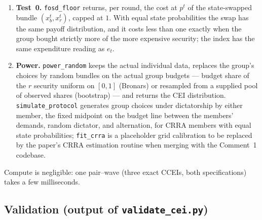 \documentclass[11pt]{article}
\theoremstyle{remark}
\begin{document}
\begin{enumerate}[leftmargin=1.6em]
\item \textbf{Test~0.} \texttt{fosd\_floor} returns, per round, the cost at $p^t$ of the state-swapped bundle $(x^t_b,x^t_r)$, capped at $1$. With equal state probabilities the swap has the same payoff distribution, and it costs less than one exactly when the group bought strictly more of the more expensive security; the index has the same expenditure reading as $e_t$.
\item \textbf{Power.} \texttt{power\_random} keeps the actual individual data, replaces the group's choices by random bundles on the actual group budgets --- budget share of the $r$ security uniform on $[0,1]$ (Bronars) or resampled from a supplied pool of observed shares (bootstrap) --- and returns the CEI distribution. \texttt{simulate\_protocol} generates group choices under dictatorship by either member, the fixed midpoint on the budget line between the members' demands, random dictator, and alternation, for CRRA members with equal state probabilities; \texttt{fit\_crra} is a placeholder grid calibration to be replaced by the paper's CRRA estimation routine when merging with the Comment~1 codebase.
\end{enumerate}
Compute is negligible: one pair--wave (three exact CCEIs, both specifications) takes a few milliseconds.

\subsection{Validation (output of \texttt{validate\_cei.py})}
\end{document}
